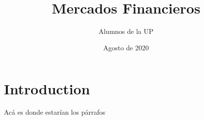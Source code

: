 \documentclass{article}
\title{Mercados Financieros}
\author{Alumnos de la UP}
\date{Agosto de 2020}
\begin{document}
\maketitle

\section{Introduction}
Acá es donde estarían los párrafos
\end{document}
